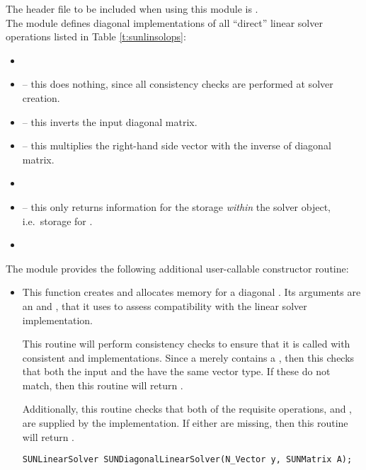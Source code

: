 \noindent The header file to be included when using this module 
is . \\
The {\sunlinsoldiag} module defines diagonal implementations of all
``direct'' linear solver operations listed in Table \ref{t:sunlinsolops}:
\begin{itemize}
\item {}
\item {} -- this does nothing, since all
  consistency checks are performed at solver creation.
\item {} -- this inverts the input diagonal
  matrix.
\item {} -- this multiplies the right-hand
  side vector with the inverse of diagonal matrix.
\item {}
\item {} -- this only returns information for
  the storage \emph{within} the solver object, i.e.~storage
  for .
\item {}
\end{itemize}
The module {\sunlinsoldiag} provides the following additional
user-callable constructor routine: 
\begin{itemize}


\item {}

  This function creates and allocates memory for a diagonal
  .  Its arguments are an {\nvector} and
  {\sunmatrix}, that it uses to assess compatibility with the linear
  solver implementation.

  This routine will perform consistency checks to ensure that it is
  called with consistent {\nvector} and {\sunmatrix} implementations.
  Since a {\sunmatdiag} merely contains a {\nvector}, then this checks
  that both the input {\nvector} and the {\sunmatdiag} {\nvector}
  have the same vector type.  If these do not match, then this routine
  will return .

  Additionally, this routine checks that both of the requisite
  {\nvector} operations,  and , are
  supplied by the {\nvector} implementation.  If either are missing,
  then this routine will return .

  \verb|SUNLinearSolver SUNDiagonalLinearSolver(N_Vector y, SUNMatrix A);|

\end{itemize}
